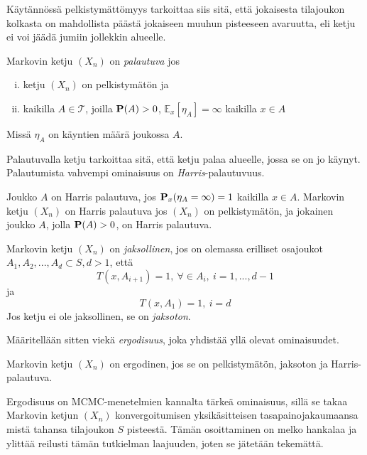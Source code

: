 Käytännössä pelkistymättömyys tarkoittaa siis sitä, että jokaisesta tilajoukon kolkasta on mahdollista päästä jokaiseen muuhun pisteeseen avaruutta, eli ketju ei voi jäädä jumiin jollekkin alueelle.

\begin{maar}
	Markovin ketju $(X_n)$ on \textit{palautuva} jos
	\begin{enumerate}[(i)]
		\item ketju $(X_n)$ on pelkistymätön ja
		\item kaikilla $A\in \mathcal{T}$, joilla $\textbf{P}(A)>0$, $\mathbb{E}_x [\eta_A]=\infty$ kaikilla $x\in A$
	\end{enumerate}
	Missä $\eta_A$ on käyntien määrä joukossa $A$.
\end{maar}

Palautuvalla ketju tarkoittaa sitä, että ketju palaa alueelle, jossa se on jo käynyt. Palautumista vahvempi ominaisuus on \textit{Harris}-palautuvuus.

\begin{maar}
	Joukko $A$ on Harris palautuva, jos $\textbf{P}_x(\eta_A =\infty) = 1$ kaikilla $x\in A$. Markovin ketju $(X_n)$ on Harris palautuva jos $(X_n)$ on pelkistymätön, ja jokainen joukko $A$, jolla $\textbf{P}(A)>0$, on Harris palautuva.
\end{maar}

\begin{maar}
	Markovin ketju $(X_n)$ on \emph{jaksollinen}, jos on olemassa erilliset osajoukot $A_1, A_2,...,A_d \subset S, d > 1$, että 
	\begin{equation}
		T(x, A_{i+1}) = 1 , \: \forall \in A_i, \: i=1,...,d-1
	\end{equation}
	ja 
	\begin{equation}
		T(x,A_1)=1, \: i = d
	\end{equation}
	Jos ketju ei ole jaksollinen, se on \textit{jaksoton}.
\end{maar}

Määritellään sitten viekä \emph{ergodisuus}, joka yhdistää yllä olevat ominaisuudet.

\begin{maar}
	Markovin ketju $(X_n)$ on ergodinen, jos se on pelkistymätön, jaksoton ja Harris-palautuva.
\end{maar}

Ergodisuus on MCMC-menetelmien kannalta tärkeä ominaisuus, sillä se takaa Markovin ketjun $(X_n)$ konvergoitumisen yksikäsitteisen tasapainojakaumaansa mistä tahansa tilajoukon $S$ pisteestä. Tämän osoittaminen on melko hankalaa ja ylittää reilusti tämän tutkielman laajuuden, joten se jätetään tekemättä.



